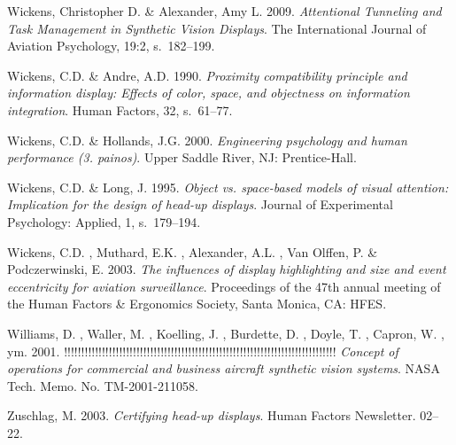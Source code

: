 \documentclass[utf8,bachelor,manualbib]{gradu3}
\begin{document}
\begin{thebibliography}{}
Wickens, Christopher D. \& Alexander, Amy L. 2009.
\textit{Attentional Tunneling and Task Management in Synthetic Vision Displays}.
The International Journal of Aviation Psychology, 19:2, s.~182--199.

Wickens, C.D. \& Andre, A.D. 1990.
\textit{Proximity compatibility principle and information display: Effects
of color, space, and objectness on information integration}.
Human Factors, 32, s.~61--77.

Wickens, C.D. \& Hollands, J.G. 2000.
\textit{Engineering psychology and human performance (3. painos)}.
Upper Saddle River, NJ: Prentice-Hall.

Wickens, C.D. \& Long, J. 1995.
\textit{Object vs. space-based models of visual attention: Implication for the design of head-up displays}.
Journal of Experimental Psychology: Applied, 1, s.~179--194.

Wickens, C.D. , Muthard, E.K. , Alexander, A.L. , Van Olffen, P. \& Podczerwinski, E. 2003.
\textit{The influences of display highlighting and size and event eccentricity for aviation surveillance}.
Proceedings of the 47th annual meeting of the Human Factors \& Ergonomics Society, Santa Monica, CA: HFES.

Williams, D. , Waller, M. , Koelling, J. , Burdette, D. , Doyle, T. , Capron, W. , ym. 2001. !!!!!!!!!!!!!!!!!!!!!!!!!!!!!!!!!!!!!!!!!!!!!!!!!!!!!!!!!!!!!!!!!!!!!!!!!!!!!!!
\textit{Concept of operations for commercial and business aircraft synthetic vision systems}.
NASA Tech. Memo. No. TM-2001-211058.

Zuschlag, M. 2003.
\textit{Certifying head-up displays}.
Human Factors Newsletter. 02--22.

\end{thebibliography}
\end{document}
